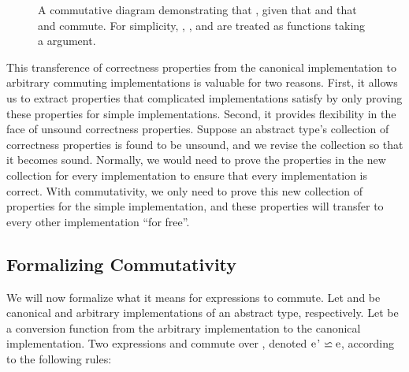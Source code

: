 \documentclass[12pt]{article}
\begin{document}
  \begin{figure}[H]
    \centering
    \caption{A commutative diagram demonstrating that , given that  and that  and  commute. For simplicity, , , and  are treated as functions taking a  argument.}
  \end{figure}

  \noindent This transference of correctness properties from the canonical implementation to arbitrary commuting implementations is valuable for two reasons. First, it allows us to extract properties that complicated implementations satisfy by only proving these properties for simple implementations. Second, it provides flexibility in the face of unsound correctness properties. Suppose an abstract type's collection of correctness properties is found to be unsound, and we revise the collection so that it becomes sound. Normally, we would need to prove the properties in the new collection for every implementation to ensure that every implementation is correct. With commutativity, we only need to prove this new collection of properties for the simple implementation, and these properties will transfer to every other implementation ``for free''.

  \subsection{Formalizing Commutativity}

  \noindent We will now formalize what it means for expressions to commute. Let  and  be canonical and arbitrary implementations of an abstract type, respectively. Let  be a conversion function from the arbitrary implementation to the canonical implementation. Two expressions  and  commute over , denoted $\commutes{\code{e'}}{\code{e}}$, according to the following rules:
\end{document}
